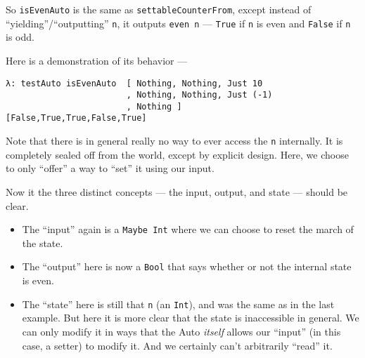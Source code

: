 \documentclass[]{article}
\newenvironment{Shaded}{}{}
\newcommand{\KeywordTok}[1]{\textcolor[rgb]{0.00,0.44,0.13}{\textbf{{#1}}}}
\newcommand{\DataTypeTok}[1]{\textcolor[rgb]{0.56,0.13,0.00}{{#1}}}
\newcommand{\DecValTok}[1]{\textcolor[rgb]{0.25,0.63,0.44}{{#1}}}
\newcommand{\OtherTok}[1]{\textcolor[rgb]{0.00,0.44,0.13}{{#1}}}
\newcommand{\FunctionTok}[1]{\textcolor[rgb]{0.02,0.16,0.49}{{#1}}}
\newcommand{\NormalTok}[1]{{#1}}
\begin{document}
\begin{Shaded}
\end{Shaded}

So \texttt{isEvenAuto} is the same as \texttt{settableCounterFrom},
except instead of ``yielding''/``outputting'' \texttt{n}, it outputs
\texttt{even\ n} --- \texttt{True} if \texttt{n} is even and
\texttt{False} if \texttt{n} is odd.

Here is a demonstration of its behavior ---

\begin{verbatim}
λ: testAuto isEvenAuto  [ Nothing, Nothing, Just 10
                        , Nothing, Nothing, Just (-1)
                        , Nothing ]
[False,True,True,False,True]
\end{verbatim}

Note that there is in general really no way to ever access the
\texttt{n} internally. It is completely sealed off from the world,
except by explicit design. Here, we choose to only ``offer'' a way to
``set'' it using our input.

Now it the three distinct concepts --- the input, output, and state ---
should be clear.

\begin{itemize}
\tightlist
\item
  The ``input'' again is a \texttt{Maybe\ Int} where we can choose to
  reset the march of the state.
\item
  The ``output'' here is now a \texttt{Bool} that says whether or not
  the internal state is even.
\item
  The ``state'' here is still that \texttt{n} (an \texttt{Int}), and was
  the same as in the last example. But here it is more clear that the
  state is inaccessible in general. We can only modify it in ways that
  the Auto \emph{itself} allows our ``input'' (in this case, a setter)
  to modify it. And we certainly can't arbitrarily ``read'' it.
\end{itemize}
\end{document}
